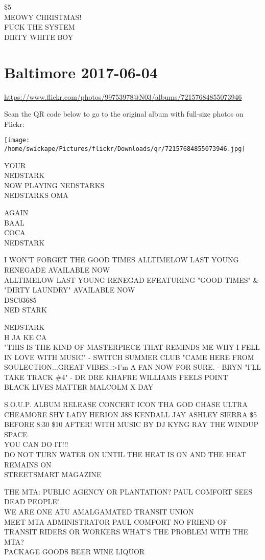 \documentclass[10pt,letterpaper]{article}
\begin{document}
\$5\\
MEOWY CHRISTMAS!\\
FUCK THE SYSTEM\\
DIRTY WHITE BOY


\section*{Baltimore 2017-06-04}

\url{https://www.flickr.com/photos/99753978@N03/albums/72157684855073946}

Scan the QR code below to go to the original album with full-size photos on Flickr:

\texttt{[image: /home/swickape/Pictures/flickr/Downloads/qr/72157684855073946.jpg]}


YOUR\\
NEDSTARK\\
NOW PLAYING NEDSTARKS\\
NEDSTARKS OMA

AGAIN\\
BAAL\\
COCA\\
NEDSTARK

I WON'T FORGET THE GOOD TIMES ALLTIMELOW LAST YOUNG RENEGADE AVAILABLE NOW\\
ALLTIMELOW LAST YOUNG RENEGAD EFEATURING "GOOD TIMES" \& "DIRTY LAUNDRY" AVAILABLE NOW\\
DSC03685\\
NED STARK

NEDSTARK\\
H JA KE CA\\
"THIS IS THE KIND OF MASTERPIECE THAT REMINDS ME WHY I FELL IN LOVE WITH MUSIC" {-} SWITCH SUMMER CLUB "CAME HERE FROM SOULECTION...GREAT VIBES..>I'm A FAN NOW FOR SURE.  {-} BRYN "I'LL TAKE TRACK \#4" {-} DR DRE KHAFRE WILLIAMS FEELS POINT\\
BLACK LIVES MATTER MALCOLM X DAY

S.O.U.P. ALBUM RELEASE CONCERT ICON THA GOD CHASE ULTRA CHEAMORE SHY LADY HERION J8S KENDALL JAY ASHLEY SIERRA \$5 BEFORE 8:30 \$10 AFTER!  WITH MUSIC BY DJ KYNG RAY THE WINDUP SPACE\\
YOU CAN DO IT!!!\\
DO NOT TURN WATER ON UNTIL THE HEAT IS ON AND THE HEAT REMAINS ON\\
STREETSMART MAGAZINE

THE MTA: PUBLIC AGENCY OR PLANTATION?  PAUL COMFORT SEES DEAD PEOPLE!\\
WE ARE ONE ATU AMALGAMATED TRANSIT UNION\\
MEET MTA ADMINISTRATOR PAUL COMFORT NO FRIEND OF TRANSIT RIDERS OR WORKERS WHAT'S THE PROBLEM WITH THE MTA?\\
PACKAGE GOODS BEER WINE LIQUOR
\end{document}

